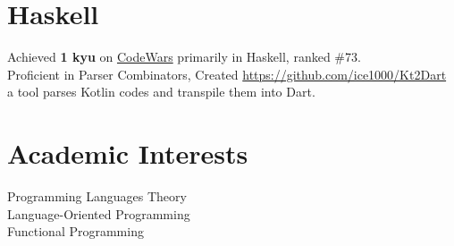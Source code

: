 \documentclass[margin, line]{res}
\begin{document}
\begin{resume}
  \section{\sc Haskell}
  Achieved
  \textbf{1 kyu} on
  \href{https://www.codewars.com/users/ice1000} {CodeWars}
  primarily in Haskell, ranked \#73. \\
  Proficient in Parser Combinators, Created
  \url{https://github.com/ice1000/Kt2Dart} \\
  a tool parses Kotlin codes and transpile them into Dart.

	\section{\sc Academic Interests}
	Programming Languages Theory \\
	Language-Oriented Programming \\
	Functional Programming
\end{resume}
\end{document}
